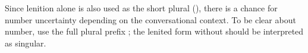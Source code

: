 \subsubsection{} Since lenition alone is also used as the short plural
(), there is a chance for number
uncertainty depending on the conversational context.  To be clear
about number, use the full plural prefix ; the lenited form
without  should be interpreted as singular.
\label{syn:adp:short-plural}


%
%
%
%
%
